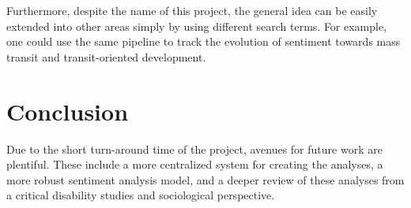\documentclass[11pt,a4paper, twocolumn]{article}
\begin{document}
Furthermore, despite the name of this project, the general idea can be easily extended into other areas simply by using different search terms. For example, one could use the same pipeline to track the evolution of sentiment towards mass transit and transit-oriented development. 

\section{Conclusion}
Due to the short turn-around time of the project, avenues for future work are plentiful. These include a more centralized system for creating the analyses, a more robust sentiment analysis model, and a deeper review of these analyses from a critical disability studies and sociological perspective.



\end{document}
